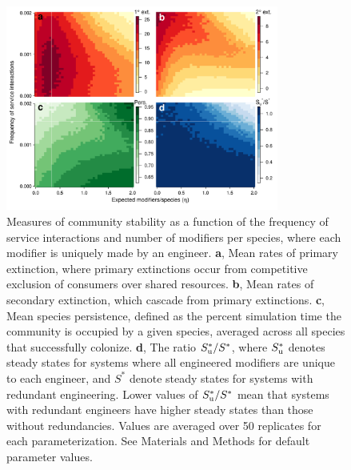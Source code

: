 \documentclass[twocolumn,preprintnumbers,amsmath,amssymb,superscriptaddress,linenumbers]{revtex4-1}
\begin{document}
\begin{figure}[h!]
\centering
\includegraphics[width=0.8\textwidth]{fig_engineers4_unique.pdf}
\caption{
Measures of community stability as a function of the frequency of service interactions and number of modifiers per species, where each modifier is uniquely made by an engineer.
\textbf{a}, Mean rates of primary extinction, where primary extinctions occur from competitive exclusion of consumers over shared resources.
\textbf{b}, Mean rates of secondary extinction, which cascade from primary extinctions.
\textbf{c}, Mean species persistence, defined as the percent simulation time the community is occupied by a given species, averaged across all species that successfully colonize.
\textbf{d}, The ratio $S^*_{\rm u}/S^*$, where $S^*_{\rm u}$ denotes steady states for systems where all engineered modifiers are unique to each engineer, and $S^*$ denote steady states for systems with redundant engineering. Lower values of $S^*_{\rm u}/S^*$ mean that systems with redundant engineers have higher steady states than those without redundancies.
Values are averaged over 50 replicates for each parameterization.
See Materials and Methods for default parameter values.
}
\label{fig:unique}
\end{figure}
\end{document}

